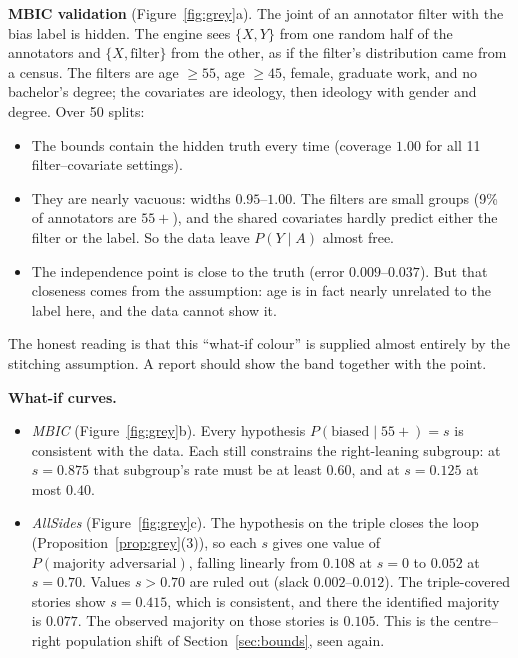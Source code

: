 \documentclass[11pt]{article}
\theoremstyle{definition}
\theoremstyle{remark}
\begin{document}
\textbf{MBIC validation} (Figure~\ref{fig:grey}a). The joint of an annotator filter with the bias label is hidden. The engine sees $\{X,Y\}$ from one random half of the annotators and $\{X,\text{filter}\}$ from the other, as if the filter's distribution came from a census. The filters are age $\ge55$, age $\ge45$, female, graduate work, and no bachelor's degree; the covariates are ideology, then ideology with gender and degree. Over 50 splits:
\begin{itemize}
  \item The bounds contain the hidden truth every time (coverage $1.00$ for all 11 filter--covariate settings).
  \item They are nearly vacuous: widths $0.95$--$1.00$. The filters are small groups (9\% of annotators are $55{+}$), and the shared covariates hardly predict either the filter or the label. So the data leave $P(Y\mid A)$ almost free.
  \item The independence point is close to the truth (error $0.009$--$0.037$). But that closeness comes from the assumption: age is in fact nearly unrelated to the label here, and the data cannot show it.
\end{itemize}
The honest reading is that this ``what-if colour'' is supplied almost entirely by the stitching assumption. A report should show the band together with the point.

\textbf{What-if curves.}
\begin{itemize}
  \item \emph{MBIC} (Figure~\ref{fig:grey}b). Every hypothesis $P(\text{biased}\mid55{+})=s$ is consistent with the data. Each still constrains the right-leaning subgroup: at $s=0.875$ that subgroup's rate must be at least $0.60$, and at $s=0.125$ at most $0.40$.
  \item \emph{AllSides} (Figure~\ref{fig:grey}c). The hypothesis on the triple closes the loop (Proposition~\ref{prop:grey}(3)), so each $s$ gives one value of $P(\text{majority adversarial})$, falling linearly from $0.108$ at $s=0$ to $0.052$ at $s=0.70$. Values $s>0.70$ are ruled out (slack $0.002$--$0.012$). The triple-covered stories show $s=0.415$, which is consistent, and there the identified majority is $0.077$. The observed majority on those stories is $0.105$. This is the centre--right population shift of Section~\ref{sec:bounds}, seen again.
\end{itemize}
\end{document}
